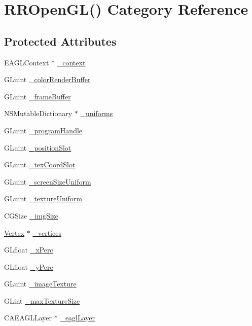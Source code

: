\hypertarget{category_r_r_open_g_l_07_08}{\section{R\-R\-Open\-G\-L() Category Reference}
\label{category_r_r_open_g_l_07_08}
}
\subsection*{Protected Attributes}
\begin{DoxyCompactItemize}
\item 
E\-A\-G\-L\-Context $\ast$ \hyperlink{category_r_r_open_g_l_07_08_a938ed89ec0181f963c31d0c5fdc02176}{\-\_\-context}
\item 
G\-Luint \hyperlink{category_r_r_open_g_l_07_08_a46a5ed84331dd7b9a5c5bffa57088517}{\-\_\-color\-Render\-Buffer}
\item 
G\-Luint \hyperlink{category_r_r_open_g_l_07_08_a81d58bd63fb9b2ffc1af35a25d2986ce}{\-\_\-frame\-Buffer}
\item 
N\-S\-Mutable\-Dictionary $\ast$ \hyperlink{category_r_r_open_g_l_07_08_a6a8737289b82b1040fb83611fa628f10}{\-\_\-uniforms}
\item 
G\-Luint \hyperlink{category_r_r_open_g_l_07_08_aca11e160448b5250499f12da3ff9acf9}{\-\_\-program\-Handle}
\item 
G\-Luint \hyperlink{category_r_r_open_g_l_07_08_a31ff365cfae59fb5f15ef0c760f1d83b}{\-\_\-position\-Slot}
\item 
G\-Luint \hyperlink{category_r_r_open_g_l_07_08_a108b75cc5fe4fef5e645d5117aaa31b8}{\-\_\-tex\-Coord\-Slot}
\item 
G\-Luint \hyperlink{category_r_r_open_g_l_07_08_a9f206bcd4244a71416cc403a65e23a9e}{\-\_\-screen\-Size\-Uniform}
\item 
G\-Luint \hyperlink{category_r_r_open_g_l_07_08_af49c0ad312e695637e520dd58c817d6e}{\-\_\-texture\-Uniform}
\item 
C\-G\-Size \hyperlink{category_r_r_open_g_l_07_08_ae95143117946558b3e6456d128f5b9c3}{\-\_\-img\-Size}
\item 
\hyperlink{struct_vertex}{Vertex} $\ast$ \hyperlink{category_r_r_open_g_l_07_08_a95d3fc75bc2d6d641d51e58aaeabe782}{\-\_\-vertices}
\item 
G\-Lfloat \hyperlink{category_r_r_open_g_l_07_08_a2954e047e8630ffedf933ebd8c8bcc28}{\-\_\-x\-Perc}
\item 
G\-Lfloat \hyperlink{category_r_r_open_g_l_07_08_a924c638c3c6712af2a18572577cff216}{\-\_\-y\-Perc}
\item 
G\-Luint \hyperlink{category_r_r_open_g_l_07_08_abdd2c9578faed52c72551da5753b8cae}{\-\_\-image\-Texture}
\item 
G\-Lint \hyperlink{category_r_r_open_g_l_07_08_ab320656c02aa7dc3045fe50a37e4e0a8}{\-\_\-max\-Texture\-Size}
\item 
C\-A\-E\-A\-G\-L\-Layer $\ast$ \hyperlink{category_r_r_open_g_l_07_08_aca7dd991eedd2f48196567fcc2b771f1}{\-\_\-eagl\-Layer}
\end{DoxyCompactItemize}


